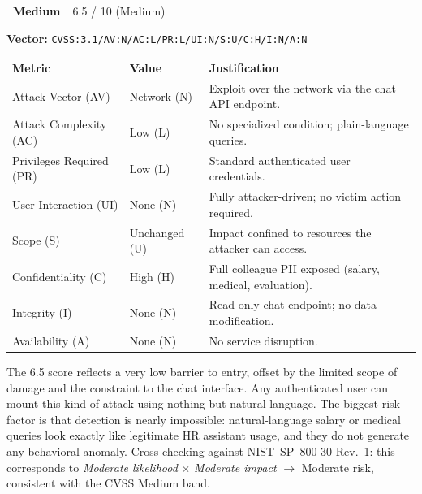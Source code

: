 \documentclass[12pt, a4paper]{report}
\newcommand{\badgemedium}{\colorbox{safe}{\color{white}\small\textbf{~Medium~}}}
\newcommand{\cvssvec}[1]{\texttt{\small #1}}
\begin{document}
\begin{cvssbox}{\badgemedium\ 6.5 / 10 (Medium)}
\vspace{2pt}
\begin{center}
\textbf{Vector:}\enspace
\cvssvec{CVSS:3.1/AV:N/AC:L/PR:L/UI:N/S:U/C:H/I:N/A:N}
\end{center}
\vspace{8pt}
\begin{tabular}{L{3.4cm} L{2.2cm} L{7.8cm}}
  \color{white}\small\textbf{Metric} &
  \color{white}\small\textbf{Value} &
  \color{white}\small\textbf{Justification} \\
  \small Attack Vector (AV)     & \small Network (N) & \small Exploit over the network via the chat API endpoint. \\
  \small Attack Complexity (AC) & \small Low (L)     & \small No specialized condition; plain-language queries. \\
  \small Privileges Required (PR)  & \small Low (L) & \small Standard authenticated user credentials. \\
  \small User Interaction (UI)  & \small None (N)    & \small Fully attacker-driven; no victim action required. \\
  \small Scope (S)              & \small Unchanged (U) & \small Impact confined to resources the attacker can access. \\
  \small Confidentiality (C)    & \small High (H)    & \small Full colleague PII exposed (salary, medical, evaluation). \\
  \small Integrity (I)          & \small None (N)    & \small Read-only chat endpoint; no data modification. \\
  \small Availability (A)       & \small None (N)    & \small No service disruption. \\
\end{tabular}
\vspace{6pt}

\small The 6.5 score reflects a very low barrier to entry, offset by the
limited scope of damage and the constraint to the chat interface. Any
authenticated user can mount this kind of attack using nothing but natural
language. The biggest risk factor is that detection is nearly
impossible: natural-language salary or medical queries look exactly like
legitimate HR assistant usage, and they do not generate any behavioral
anomaly. Cross-checking against NIST~SP~800-30 Rev.~1: this corresponds
to \emph{Moderate likelihood} $\times$ \emph{Moderate impact}
$\to$ Moderate risk, consistent with the CVSS Medium band.
\end{cvssbox}
\end{document}

